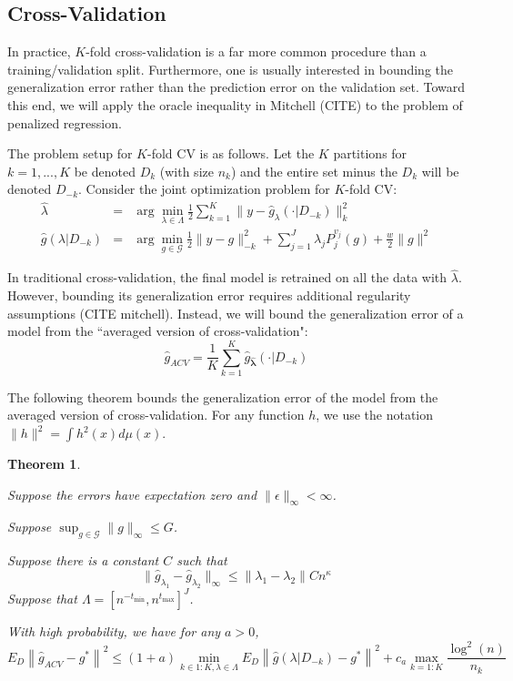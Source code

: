 \documentclass[12pt]{article}
\newtheorem{theorem}{Theorem}
\begin{document}
\subsection{Cross-Validation}

In practice, $K$-fold cross-validation is a far more common procedure than a training/validation split. Furthermore, one is usually interested in bounding the generalization error rather than the prediction error on the validation set. Toward this end, we will apply the oracle inequality in Mitchell (CITE) to the problem of penalized regression. 

The problem setup for $K$-fold CV is as follows. Let the $K$ partitions for $k=1,...,K$ be denoted $D_k$ (with size $n_k$) and the entire set minus the $D_k$ will be denoted $D_{-k}$. Consider the joint optimization problem for $K$-fold CV:
\begin{eqnarray}
\label{kfold_opt}
\hat{\lambda} &=& \arg\min_{\lambda\in\Lambda} \frac{1}{2} \sum_{k=1}^K  \| y-\hat{g}_{\lambda}(\cdot| D_{-k}) \|_{k}^{2} \\
\hat{g}(\lambda | D_{-k})&=&\arg\min_{g\in\mathcal{G}} \frac{1}{2} \| y-g \|_{-k}^{2} + \sum_{j=1}^J \lambda_j P_j^{v_j}(g) + \frac{w}{2} \|g\|^2
\end{eqnarray}

In traditional cross-validation, the final model is retrained on all the data with $\hat{\lambda}$. However, bounding its generalization error requires additional regularity assumptions (CITE mitchell). Instead, we will bound the generalization error of a model from the ``averaged version of cross-validation":
\begin{equation}
\hat{g}_{ACV} = \frac{1}{K} \sum_{k=1}^K \hat{g}_{\hat{\boldsymbol \lambda}}(\cdot | D_{-k})
\end{equation}

The following theorem bounds the generalization error of the model from the averaged version of cross-validation. For any function $h$, we use the notation $\| h \|^2 = \int h^2(x) d\mu(x)$.

\begin{theorem}
\label{kfold_thrm}

Suppose the errors have expectation zero and $\| \epsilon \|_\infty < \infty $.

Suppose $\sup_{g \in \mathcal{G}} \|g\|_\infty \le G$.

Suppose there is a constant $C$ such that
\begin{equation}
\| \hat{g}_{\lambda_1} - \hat{g}_{\lambda_2} \|_\infty \le \| \lambda_1 - \lambda_2 \| C n^\kappa
\end{equation}
Suppose that $\Lambda = [ n^{-t_{\min}}, n^{t_{\max}} ]^J $.


With high probability, we have for any $a > 0$,
\begin{equation}
\label{smooth_error_bound}
E_{D} \left \| \hat{g}_{ACV} - g^* \right \|^2 \le
(1+a) \min_{k\in 1:K, \lambda \in \Lambda}  E_{D} \left \| \hat{g}(\lambda | D_{-k}) - g^* \right \|^2
+ c_a \max_{k=1:K} \frac{\log^2(n)}{n_k}
\end{equation}
\end{theorem}
\end{document}
